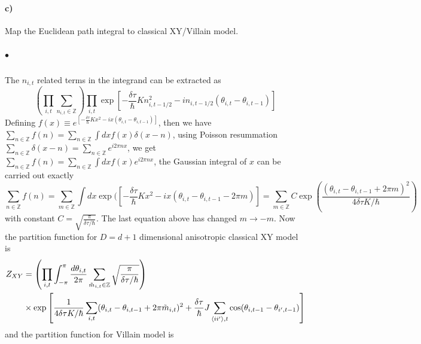 \paragraph*{c)} Map the Euclidean path integral to classical XY/Villain model.
\subparagraph*{$\bullet $}
The $n_{i, t}$ related terms in the integrand can be extracted as 
\begin{equation}
    \left(\prod_{i, t} \sum_{n_{i, t} \in \mathbb{Z} }\right) 
    \prod_{i, t} \exp \left[
        -\frac{\delta \tau}{\hbar} K n_{i, t-1/2}^2 - i n_{i, t-1/2} (\theta_{i, t} - \theta_{i, t-1}) 
    \right]
\end{equation}
Defining 
$ f(x) \equiv e^{\left[
    -\frac{\delta \tau}{\hbar} K x^2 - i x (\theta_{i, t} - \theta_{i, t-1}) 
\right]} $, 
then we have $\sum_{n \in \mathbb{Z}}f(n) = \sum_{n \in \mathbb{Z}} \int dx f(x)\delta(x-n)$, using Poisson resummation $\sum_{n \in \mathbb{Z}} \delta(x-n) = \sum_{n \in \mathbb{Z}} e^{i2\pi n x}$, we get $\sum_{n \in \mathbb{Z}}f(n) = \sum_{n \in \mathbb{Z}}\int dx f(x)e^{i2\pi n x}$, the Gaussian integral of $x$ can be carried out exactly
\begin{equation}
    \sum_{n \in \mathbb{Z}}f(n) = \sum_{m \in \mathbb{Z}}
    \int dx \exp(\left[
        -\frac{\delta \tau}{\hbar} K x^2 - i x (\theta_{i, t} - \theta_{i, t-1} - 2\pi m) \right]
    = \sum_{m \in \mathbb{Z}} C \exp(\frac{(\theta_{i, t} - \theta_{i, t-1} + 2\pi m)^2 }{4 \delta \tau K /\hbar})
\end{equation}
with constant $C = \sqrt{\frac{\pi}{\delta \tau /\hbar}}$. The last equation above has changed $ m \rightarrow -m$. 
Now the partition function for $D = d+1$ dimensional anisotropic classical XY model is
\begin{equation}
    \begin{aligned}
        Z_{XY} 
        & = \left(
            \prod_{i, t} \int_{-\pi}^{\pi} \frac{d\theta_{i, t}}{2\pi}
             \sum_{\tilde{m}_{i, t} \in \mathbb{Z} }
             \sqrt{\frac{\pi}{\delta \tau /\hbar}} \right)\\     
        & \times \exp \left[ 
                \frac{1}{4 \delta \tau K /\hbar} \sum_{i, t} 
                    (\theta_{i, t} - \theta_{i, t-1} + 2\pi \tilde{m}_{i, t})^2 
                + \frac{\delta \tau}{\hbar} J \sum_{\braket{ii'}, t} 
                    \cos(\theta_{i, t-1} - \theta_{i', t-1})
                    \right] 
    \end{aligned}
\end{equation}
and the partition function for Villain model is
